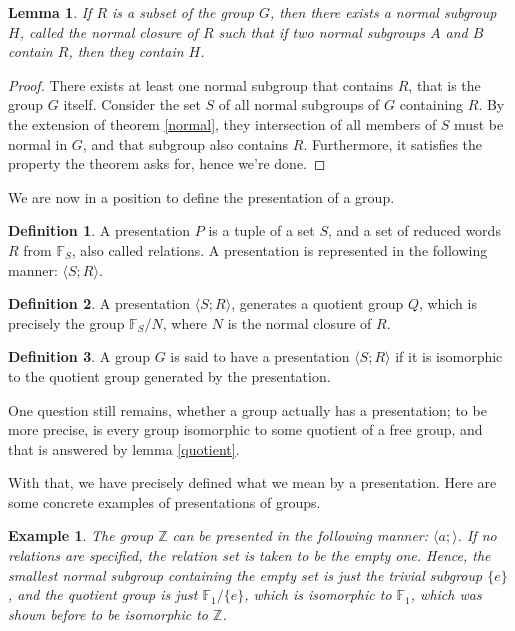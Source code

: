 \documentclass[12pt]{article}
\newtheorem{lem}[thm]{Lemma}
\newtheorem{exmp}[thm]{Example}
\theoremstyle{definition}
\newtheorem{defn}{Definition}[section]
\begin{document}
\begin{lem}\cite{meier}
If $R$ is a subset of the group $G$, then there exists a normal subgroup $H$, called the normal closure of $R$ such that if two normal subgroups $A$ and $B$ contain $R$, then they contain $H$.
\end{lem}

\begin{proof}
There exists at least one normal subgroup that contains $R$, that is the group $G$ itself. Consider the set $S$ of all normal subgroups of $G$ containing $R$. By the extension of theorem \autoref{normal}, they intersection of all members of $S$ must be normal in $G$, and that subgroup also contains $R$. Furthermore, it satisfies the property the theorem asks for, hence we're done.
\end{proof}

We are now in a position to define the presentation of a group.

\begin{defn}
A presentation $P$ is a tuple of a set $S$, and a set of reduced words $R$ from $\mathbb{F}_S$, also called relations. A presentation is represented in the following manner: $\langle S;R\rangle$.
\end{defn}

\begin{defn}
A presentation $\langle S;R\rangle$, generates a quotient group $Q$, which is precisely the group $\mathbb{F}_S/N$, where $N$ is the normal closure of $R$.
\end{defn}

\begin{defn}
A group $G$ is said to have a presentation $\langle S;R \rangle$ if it is isomorphic to the quotient group generated by the presentation.
\end{defn}

One question still remains, whether a group actually has a presentation; to be more precise, is every group isomorphic to some quotient of a free group, and that is answered by lemma \autoref{quotient}. 

With that, we have precisely defined what we mean by a presentation. Here are some concrete examples of presentations of groups.

\begin{exmp}
The group $\mathbb{Z}$ can be presented in the following manner: $\langle a;\rangle$. If no relations are specified, the relation set is taken to be the empty one. Hence, the smallest normal subgroup containing the empty set is just the trivial subgroup $\{e\}$, and the quotient group is just $\mathbb{F}_1/\{e\}$, which is isomorphic to $\mathbb{F}_1$, which was shown before to be isomorphic to $\mathbb{Z}$.
\end{exmp}
\end{document}
